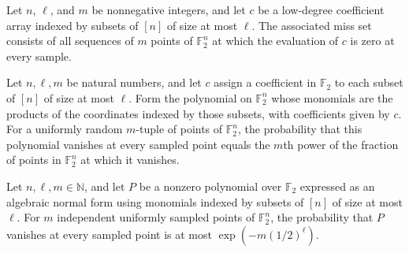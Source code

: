 \begin{definition}
\leanok
{}
Let $n$, $\ell$, and $m$ be nonnegative integers, and let $c$ be a low-degree
coefficient array indexed by subsets of $[n]$ of size at most $\ell$. The associated
miss set consists of all sequences of $m$ points of $\mathbb F_2^n$ at which the
evaluation of $c$ is zero at every sample.
\end{definition}

\begin{theorem}
\leanok
{}
Let $n,\ell,m$ be natural numbers, and let $c$ assign a coefficient in $\mathbb F_2$
to each subset of $[n]$ of size at most $\ell$. Form the polynomial on $\mathbb F_2^n$
whose monomials are the products of the coordinates indexed by those subsets, with
coefficients given by $c$. For a uniformly random $m$-tuple of points of $\mathbb
F_2^n$, the probability that this polynomial vanishes at every sampled point equals the
$m$th power of the fraction of points in $\mathbb F_2^n$ at which it vanishes.
\end{theorem}

\begin{theorem}
\leanok
{}
Let $n,\ell,m\in\mathbb{N}$, and let $P$ be a nonzero polynomial over $\mathbb{F}_2$
expressed as an algebraic normal form using monomials indexed by subsets of $[n]$ of
size at most $\ell$. For $m$ independent uniformly sampled points of $\mathbb{F}_2^n$,
the probability that $P$ vanishes at every sampled point is at most
$\exp\!\left(-m(1/2)^\ell\right)$.
\end{theorem}

